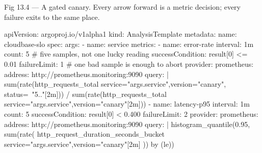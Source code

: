 \begin{wbfigure}{Fig 13.4 — A gated canary. Every arrow forward is a metric decision; every failure exits to the same place.}
\end{wbfigure}

\begin{k8sbox}
apiVersion: argoproj.io/v1alpha1
kind: AnalysisTemplate
metadata:
  name: cloudbase-slo
spec:
  args:
    - name: service
  metrics:
    - name: error-rate
      interval: 1m
      count: 5                 # five samples, not one lucky reading
      successCondition: result[0] <= 0.01
      failureLimit: 1          # one bad sample is enough to abort
      provider:
        prometheus:
          address: http://prometheus.monitoring:9090
          query: |
            sum(rate(http_requests_total{
              service="{{args.service}}",version="canary",
              status=~"5.."}[2m]))
            /
            sum(rate(http_requests_total{
              service="{{args.service}}",version="canary"}[2m]))
    - name: latency-p95
      interval: 1m
      count: 5
      successCondition: result[0] < 0.400
      failureLimit: 2
      provider:
        prometheus:
          address: http://prometheus.monitoring:9090
          query: |
            histogram_quantile(0.95, sum(rate(
              http_request_duration_seconds_bucket{
                service="{{args.service}}",version="canary"}[2m]
            )) by (le))
\end{k8sbox}

